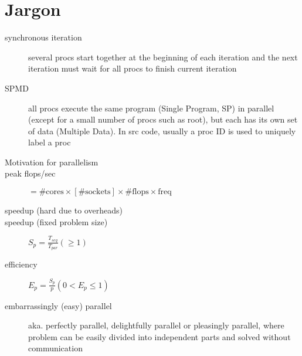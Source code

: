 \section*{Jargon}
\begin{description}

\item[synchronous iteration] several procs start together at the beginning of each iteration and the next iteration must wait for all procs to finish current iteration

\item[SPMD] all procs execute the same program (Single Program, SP) in parallel (except for a small number of procs such as root), but each has its own set of data (Multiple Data). In src code, usually a proc ID is used to uniquely label a proc

\item[Motivation for parallelism]

\item[peak flops/sec] $ = \# \text{cores} \times [\# \text{sockets}] \times \# \text{flops} \times \text{freq}$

\item[speedup (hard due to overheads)]

\item[speedup (fixed problem size)] $S_p = \frac{T_{seq}}{T_{par}} (\geq 1)$

\item[efficiency] $E_p = \frac{S_{p}}{p} (0 < E_p \leq 1)$

\item[embarrassingly (easy) parallel] aka. perfectly parallel, delightfully parallel or pleasingly parallel, where problem can be easily divided into independent parts and solved without communication


\end{description}
